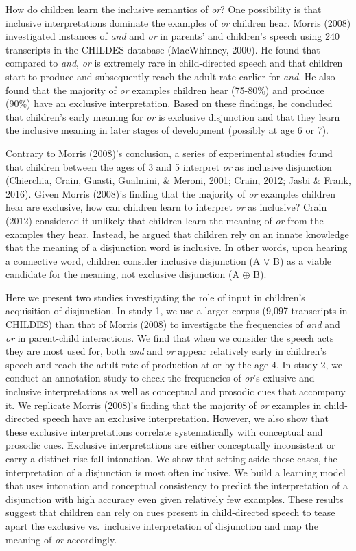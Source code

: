 \documentclass[10pt, letterpaper]{article}
\begin{document}
How do children learn the inclusive semantics of \emph{or}? One
possibility is that inclusive interpretations dominate the examples of
\emph{or} children hear. Morris (2008) investigated instances of
\emph{and} and \emph{or} in parents' and children's speech using 240
transcripts in the CHILDES database (MacWhinney, 2000). He found that
compared to \emph{and}, \emph{or} is extremely rare in child-directed
speech and that children start to produce and subsequently reach the
adult rate earlier for \emph{and}. He also found that the majority of
\emph{or} examples children hear (75-80\%) and produce (90\%) have an
exclusive interpretation. Based on these findings, he concluded that
children's early meaning for \emph{or} is exclusive disjunction and that
they learn the inclusive meaning in later stages of development
(possibly at age 6 or 7).

Contrary to Morris (2008)'s conclusion, a series of experimental studies
found that children between the ages of 3 and 5 interpret \emph{or} as
inclusive disjunction (Chierchia, Crain, Guasti, Gualmini, \& Meroni,
2001; Crain, 2012; Jasbi \& Frank, 2016). Given Morris (2008)'s finding
that the majority of \emph{or} examples children hear are exclusive, how
can children learn to interpret \emph{or} as inclusive? Crain (2012)
considered it unlikely that children learn the meaning of \emph{or} from
the examples they hear. Instead, he argued that children rely on an
innate knowledge that the meaning of a disjunction word is inclusive. In
other words, upon hearing a connective word, children consider inclusive
disjunction (A \(\vee\) B) as a viable candidate for the meaning, not
exclusive disjunction (A \(\oplus\) B).

Here we present two studies investigating the role of input in
children's acquisition of disjunction. In study 1, we use a larger
corpus (9,097 transcripts in CHILDES) than that of Morris (2008) to
investigate the frequencies of \emph{and} and \emph{or} in parent-child
interactions. We find that when we consider the speech acts they are
most used for, both \emph{and} and \emph{or} appear relatively early in
children's speech and reach the adult rate of production at or by the
age 4. In study 2, we conduct an annotation study to check the
frequencies of \emph{or}'s exlusive and inclusive interpretations as
well as conceptual and prosodic cues that accompany it. We replicate
Morris (2008)'s finding that the majority of \emph{or} examples in
child-directed speech have an exclusive interpretation. However, we also
show that these exclusive interpretations correlate systematically with
conceptual and prosodic cues. Exclusive interpretations are either
conceptually inconsistent or carry a distinct rise-fall intonation. We
show that setting aside these cases, the interpretation of a disjunction
is most often inclusive. We build a learning model that uses intonation
and conceptual consistency to predict the interpretation of a
disjunction with high accuracy even given relatively few examples. These
results suggest that children can rely on cues present in child-directed
speech to tease apart the exclusive vs.~inclusive interpretation of
disjunction and map the meaning of \emph{or} accordingly.
\end{document}
